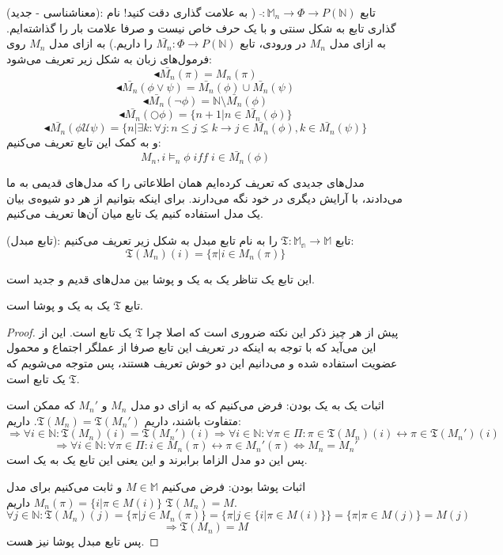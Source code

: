 \begin{defn}
	(معناشناسی - جدید): تابع 
	$\bar{ }:\mathbb{M}_n \rightarrow \Phi \rightarrow \mathit{P}(\mathbb{N})$
	( به علامت گذاری دقت کنید! نام گذاری تابع به شکل سنتی و با یک حرف خاص نیست و صرفا علامت بار را گذاشته‌ایم. به ازای مدل $M_n$ در ورودی، تابع 
	$\bar{M_n}: \Phi \rightarrow \mathit{P}(\mathbb{N})$
	 را داریم.)
	 به ازای مدل $M_n$ روی فرمول‌های زبان  به شکل زیر تعریف می‌شود:
	 $$\blacktriangleleft \bar{M_n}(\pi)= M_n(\pi)$$
	 $$\blacktriangleleft \bar{M_n}(\phi \lor \psi)= \bar{M_n}(\phi) \cup \bar{M_n}(\psi)$$
	 $$\blacktriangleleft \bar{M_n}(\neg \phi)= \mathbb{N} \setminus \bar{M_n}(\phi)$$
	 $$\blacktriangleleft \bar{M_n}(\bigcirc\phi)= \{n+1|n\in \bar{M_n}(\phi) \}$$
	 $$\blacktriangleleft \bar{M_n}(\phi \mathcal{U} \psi)= \{n|\exists k : \forall j: n \leq j \lneq k \rightarrow j \in \bar{M_n}(\phi) , k \in \bar{M_n}(\psi) \}$$
	 و به کمک این تابع تعریف می‌کنیم:
	 $$M_n,i \models_n \phi \; \mathit{iff}\; i \in \bar{M_n}(\phi)$$
\end{defn}

مدل‌های جدیدی که تعریف کرده‌ایم همان اطلاعاتی را که مدل‌های قدیمی به ما می‌دادند، با آرایش دیگری در خود نگه می‌دارند. برای اینکه بتوانیم از هر دو شیوه‌ی بیان یک مدل استفاده کنیم یک تابع میان آن‌ها تعریف می‌کنیم.

\begin{defn}
	(تابع مبدل): تابع
	$\mathfrak{T}:\mathbb{M_n} \rightarrow \mathbb{M}$
	را به نام تابع مبدل به شکل زیر تعریف می‌کنیم:
	$$\mathfrak{T}(M_n)(i)=\{ \pi | i \in M_n(\pi) \}$$
\end{defn} 

این تابع یک تناظر یک به یک و پوشا بین مدل‌های قدیم و جدید است. 
\begin{thm}
	تابع $\mathfrak{T}$ یک به یک و پوشا است.
\end{thm}
\begin{proof}
	پیش از هر چیز ذکر این نکته ضروری است که اصلا چرا $\mathfrak{T}$ یک تابع است. این از این می‌آید که با توجه به اینکه در تعریف این تابع صرفا از عملگر اجتماع و محمول عضویت استفاده شده و می‌دانیم این دو خوش تعریف هستند، پس متوجه می‌شویم که $\mathfrak{T}$ یک تابع است.
	
	اثبات یک به یک بودن:
	فرض می‌‌کنیم که به ازای دو مدل $M_n$ و $M_n'$ که ممکن است متفاوت باشند، داریم $\mathfrak{T}(M_n)=\mathfrak{T}(M_n')$. داریم:
	$$\Rightarrow \forall i \in \mathbb{N}: \mathfrak{T}(M_n)(i)=\mathfrak{T}(M_n')(i)
	\Rightarrow \forall i \in \mathbb{N}: \forall \pi \in \Pi: \pi \in \mathfrak{T}(M_n)(i) \leftrightarrow \pi \in \mathfrak{T}(M_n')(i)$$
	$$\Rightarrow \forall i \in \mathbb{N}: \forall \pi \in \Pi: i \in M_n(\pi) \leftrightarrow \pi \in M_n'(\pi) \iff M_n = M_n'$$
	پس این دو مدل الزاما برابرند و این یعنی این تابع یک به یک است.
	
	اثبات پوشا بودن: فرض می‌کنیم $M \in \mathbb{M}$ و ثابت می‌کنیم برای مدل \break
	 $M_n (\pi)=\{i | \pi \in M(i)\}$ 
	داریم $\mathfrak{T}(M_n)=M$.
	$$\forall j \in \mathbb{N}: \mathfrak{T}(M_n)(j)=\{\pi | j \in M_n(\pi)\}
	=\{\pi | j \in \{i | \pi \in M(i)\}\}= \{\pi | \pi \in M(j)\}=M(j)$$
	$$\Rightarrow \mathfrak{T}(M_n)=M$$
	پس تابع مبدل پوشا نیز هست.
\end{proof}

